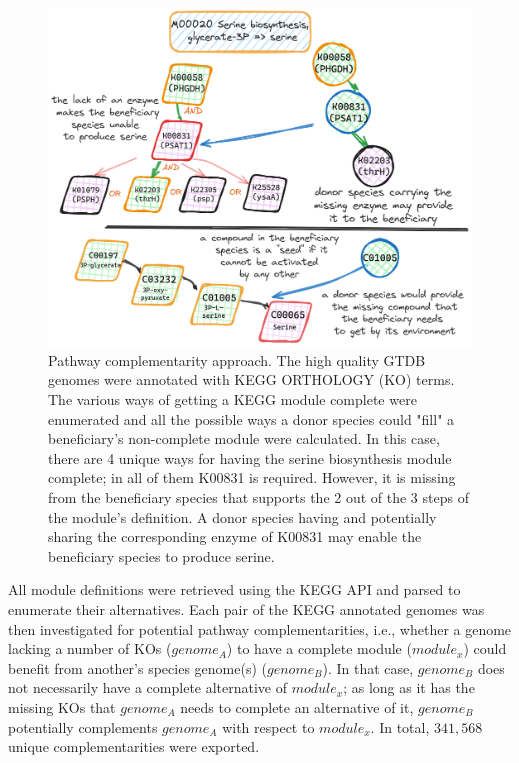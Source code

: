 \documentclass[sn-mathphys,Numbered]{sn-jnl}  %
\theoremstyle{thmstyleone}%
\theoremstyle{thmstyletwo}%
\theoremstyle{thmstylethree}%
\begin{document}
        \begin{figure}[h!]
            \includegraphics*[width=0.8\columnwidth]{figs/path_complem.png}
            \caption{
                Pathway complementarity approach. 
                The high quality GTDB genomes were annotated with KEGG ORTHOLOGY (KO) terms.
                The various ways of getting a KEGG module complete were enumerated and all the possible ways a donor species could "fill" a beneficiary's non-complete module were calculated.
                In this case, there are 4 unique ways for having the serine biosynthesis module complete; in all of them K00831 is required.
                However, it is missing from the beneficiary species that supports the 2 out of the 3 steps of the module's definition.
                A donor species having and potentially sharing the corresponding enzyme of K00831 may enable the beneficiary species to produce serine.
            }
            \label{fig:pathcompl}
        \end{figure}

        All module definitions were retrieved using the KEGG API and parsed to enumerate their alternatives.
        Each pair of the KEGG annotated genomes was then investigated for potential pathway complementarities, 
        i.e., whether a genome lacking a number of KOs ($genome_A$) to have a complete module ($module_x$) could benefit from another's species genome(s) ($genome_B$).
        In that case, $genome_B$ does not necessarily have a complete alternative of $module_x$; as long as it has the missing KOs that $genome_A$ needs to complete an alternative of it, $genome_B$ potentially complements $genome_A$ with respect to $module_x$.
        In total, $341,568$ unique complementarities were exported.
\end{document}
